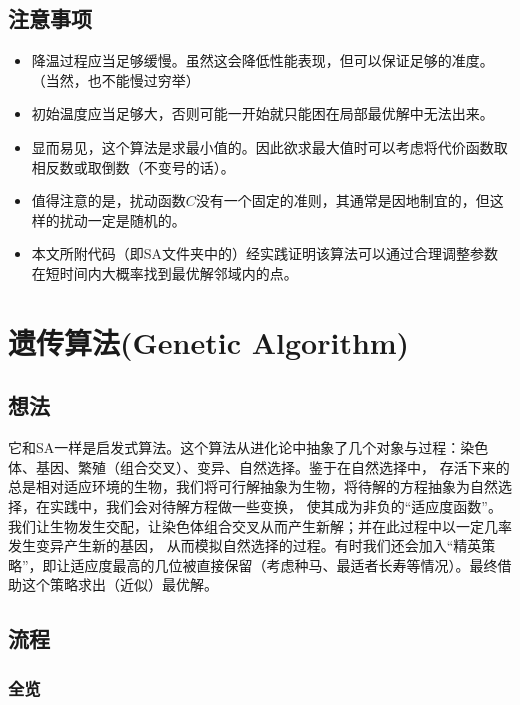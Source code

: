 \documentclass{ctexart}
\begin{document}
\subsection{注意事项}

\begin{itemize}
    \item 降温过程应当足够缓慢。虽然这会降低性能表现，但可以保证足够的准度。（当然，也不能慢过穷举）
    \item 初始温度应当足够大，否则可能一开始就只能困在局部最优解中无法出来。
    \item 显而易见，这个算法是求最小值的。因此欲求最大值时可以考虑将代价函数取相反数或取倒数（不变号的话）。
    \item 值得注意的是，扰动函数$C$没有一个固定的准则，其通常是因地制宜的，但这样的扰动一定是随机的。
    \item 本文所附代码（即SA文件夹中的）经实践证明该算法可以通过合理调整参数在短时间内大概率找到最优解邻域内的点。
\end{itemize}

\section{遗传算法(Genetic Algorithm)}

\subsection{想法}

它和SA一样是启发式算法。这个算法从进化论中抽象了几个对象与过程：染色体、基因、繁殖（组合交叉）、变异、自然选择。鉴于在自然选择中，
存活下来的总是相对适应环境的生物，我们将可行解抽象为生物，将待解的方程抽象为自然选择，在实践中，我们会对待解方程做一些变换，
使其成为非负的“适应度函数”。我们让生物发生交配，让染色体组合交叉从而产生新解；并在此过程中以一定几率发生变异产生新的基因，
从而模拟自然选择的过程。有时我们还会加入“精英策略”，即让适应度最高的几位被直接保留（考虑种马、最适者长寿等情况）。最终借助这个策略求出（近似）最优解。

\subsection{流程}

\subsubsection{全览}
\end{document}
